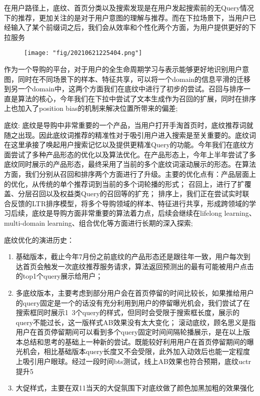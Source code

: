 在用户路径上，底纹、首页分类以及搜索发现是在用户发起搜索前的无Query情况下的推荐，更加关注的是对于用户意图的理解与推荐。而在下拉场景下，当用户已经输入了某个前缀词之后，我们会从效率和个性化两个方面，为用户提供更好的下拉服务

\begin{figure}[!h]
	\centering
	\texttt{[image: "fig/20210621225404.png"]}
	\caption{}
	\label{fig:20210621225243}
\end{figure}

作为一个导购的平台，对于用户的全生命周期学习与表示能够更好地识别用户意图，同时在不同场景下的样本、特征共享，可以将一个domain的信息平滑的迁移到另一个domain中，这两个方面我们在底纹中进行了初步的尝试。召回与排序一直是算法的核心，今年我们在下拉中尝试了文本生成作为召回的扩展，同时在排序上也加入了position bias的机制来解决位置所带来的偏差; 

底纹: 底纹是导购中非常重要的一个产品，当用户打开手淘首页时，底纹推荐词就随之出现。因此底纹词推荐的精准性对于吸引用户进入搜索是至关重要的。底纹词在这里承接了唤起用户搜索记忆以及提供更精准Query的功能。今年我们在底纹方面尝试了多种产品形态的优化以及算法优化。在产品形态上，今年上半年尝试了多底纹同时展示的产品形态，最终采用了当前的多个底纹词滚动展示的形态。在算法方面，我们分别从召回和排序两个方面进行了升级。主要的优化点有：产品层面上的优化，从传统的单个推荐词到当前的多个词轮播的形式；
召回上，进行了扩覆盖、分层召回以及权益类Query的召回等的扩充；
排序上，我们正在尝试实时联合反馈的LTR排序模型，将多个导购领域的样本、特征进行共享，形成跨领域的学习后续，底纹是导购方面非常重要的算法着力点，后续会继续在lifelong learning、multi-domain learning、组合优化等方面进行长期的深入探索; 

底纹优化的演进历史： 
\begin{enumerate}

\item 基础版本，截止今年7月份之前底纹的产品形态还是跟往年一致，用户每次到达首页会触发一次底纹推荐服务请求，算法返回预测出的最有可能被用户点击的top1个query展示给用户；
\item 多底纹版本，主要考虑到部分用户会在首页停留的时间比较长，如果推给用户的query固定是一个的话没有充分利用到用户的停留曝光机会，我们尝试了在搜索框同时展示1~3个query的样式，但同时会受限于搜索框长度，展示的query不能过长，这一版样式AB效果没有太大变化；
\iteem 滚动底纹，顾名思义是指用户在首页停留期间可以看到多个query固定时间间隔轮播展示，是在以上版本总结和思考的基础上一种新的尝试。既能较好利用用户在首页停留期间的曝光机会，相比基础版本query长度又不会受限，此外加入动效后也能一定程度上吸引用户眼球。经过一段时间bts测试，线上AB效果也符合预期，底纹uctr提升5%
\item 大促样式，主要在双11当天的大促氛围下对底纹做了颜色加黑加粗的效果强化
\end{enumerate}

